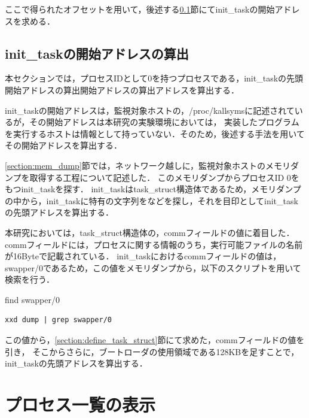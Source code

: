 ここで得られたオフセットを用いて，後述する\ref{subsection:find_init_task}節にてinit\_taskの開始アドレスを求める．

\subsection{init\_taskの開始アドレスの算出}
\label{subsection:find_init_task}

本セクションでは，プロセスIDとして0を持つプロセスである，init\_taskの先頭開始アドレスの算出開始アドレスの算出アドレスを算出する．

init\_taskの開始アドレスは，監視対象ホストの，/proc/kallsymsに記述されているが，その開始アドレスは本研究の実験環境においては，
実装したプログラムを実行するホストは情報として持っていない．そのため，後述する手法を用いてその開始アドレスを算出する．

\ref{section:mem_dump}節では，ネットワーク越しに，監視対象ホストのメモリダンプを取得する工程について記述した．
このメモリダンプからプロセスID 0をもつinit\_taskを探す．
init\_taskはtask\_struct構造体であるため，メモリダンプの中から，init\_taskに特有の文字列をなどを探し，それを目印としてinit\_taskの先頭アドレスを算出する．

本研究においては，task\_struct構造体の，commフィールドの値に着目した．
commフィールドには，プロセスに関する情報のうち，実行可能ファイルの名前が16Byteで記載されている．
init\_taskにおけるcommフィールドの値は，swapper/0であるため，この値をメモリダンプから，以下のスクリプトを用いて検索を行う．

\begin{itembox}[l]{find swapper/0}
    \begin{verbatim}
xxd dump | grep swapper/0
    \end{verbatim}
\end{itembox}

この値から，\ref{section:define_task_struct}節にて求めた，commフィールドの値を引き，
そこからさらに，ブートローダの使用領域である128KBを足すことで，init\_taskの先頭アドレスを算出する．



\section{プロセス一覧の表示}
\label{subsection:process-list}


